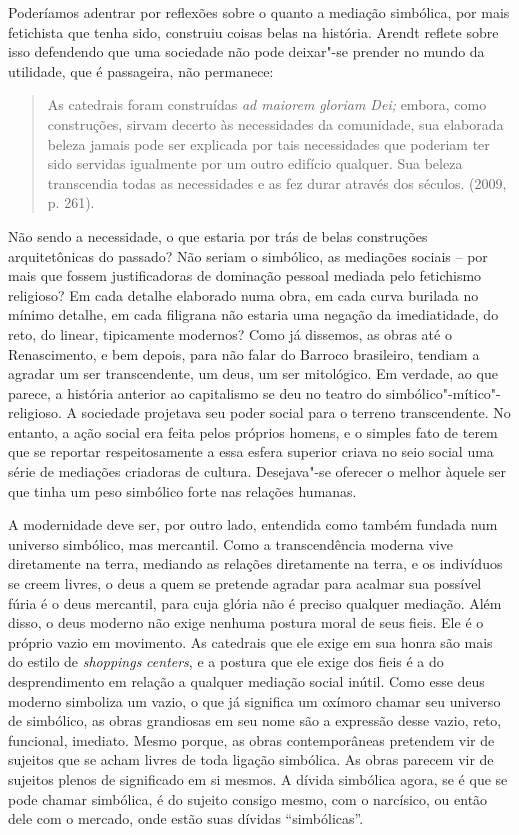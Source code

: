 {Poderíamos adentrar por reflexões sobre o quanto a mediação simbólica,
por mais fetichista que tenha sido, construiu coisas belas na história.
Arendt reflete sobre isso defendendo que uma sociedade não pode
deixar"-se prender no mundo da utilidade, que é passageira, não
permanece:

\begin{quote}
As catedrais foram construídas \emph{ad maiorem gloriam Dei;} embora,
como construções, sirvam decerto às necessidades da comunidade, sua
elaborada beleza jamais pode ser explicada por tais necessidades que
poderiam ter sido servidas igualmente por um outro edifício qualquer.
Sua beleza transcendia todas as necessidades e as fez durar através dos
séculos. (2009, p. 261).
\end{quote}

Não sendo a necessidade, o que estaria por trás de belas construções
arquitetônicas do passado? Não seriam o simbólico, as mediações sociais
-- por mais que fossem justificadoras de dominação pessoal mediada pelo
fetichismo religioso? Em cada detalhe elaborado numa obra, em cada curva
burilada no mínimo detalhe, em cada filigrana não estaria uma negação da
imediatidade, do reto, do linear, tipicamente modernos? Como já
dissemos, as obras até o Renascimento, e bem depois, para não falar do
Barroco brasileiro, tendiam a agradar um ser transcendente, um deus, um
ser mitológico. Em verdade, ao que parece, a história anterior ao
capitalismo se deu no teatro do simbólico"-mítico"-religioso. A sociedade
projetava seu poder social para o terreno transcendente. No entanto, a
ação social era feita pelos próprios homens, e o simples fato de terem
que se reportar respeitosamente a essa esfera superior criava no seio
social uma série de mediações criadoras de cultura. Desejava"-se oferecer
o melhor àquele ser que tinha um peso simbólico forte nas relações
humanas.

A modernidade deve ser, por outro lado, entendida como também fundada
num universo simbólico, mas mercantil. Como a transcendência moderna
vive diretamente na terra, mediando as relações diretamente na terra, e
os indivíduos se creem livres, o deus a quem se pretende agradar para
acalmar sua possível fúria é o deus mercantil, para cuja glória não é
preciso qualquer mediação. Além disso, o deus moderno não exige nenhuma
postura moral de seus fieis. Ele é o próprio vazio em movimento. As
catedrais que ele exige em sua honra são mais do estilo de
\emph{shoppings} \emph{centers}, e a postura que ele exige dos fieis é a
do desprendimento em relação a qualquer mediação social inútil. Como
esse deus moderno simboliza um vazio, o que já significa um oxímoro
chamar seu universo de simbólico, as obras grandiosas em seu nome são a
expressão desse vazio, reto, funcional, imediato. Mesmo porque, as obras
contemporâneas pretendem vir de sujeitos que se acham livres de toda
ligação simbólica. As obras parecem vir de sujeitos plenos de
significado em si mesmos. A dívida simbólica agora, se é que se pode
chamar simbólica, é do sujeito consigo mesmo, com o narcísico, ou então
dele com o mercado, onde estão suas dívidas ``simbólicas''.

}
